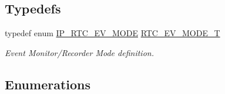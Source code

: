 \subsection*{Typedefs}
\begin{DoxyCompactItemize}
\item 
typedef enum \hyperlink{group___r_t_c__18_x_x__43_x_x_gaefde431348a2ce3d7721a63780e9d9ba}{I\+P\+\_\+\+R\+T\+C\+\_\+\+E\+V\+\_\+\+M\+O\+DE} \hyperlink{group___r_t_c__18_x_x__43_x_x_gabcbfff4a7d52791dc0b1cdcb078a2a05}{R\+T\+C\+\_\+\+E\+V\+\_\+\+M\+O\+D\+E\+\_\+T}
\begin{DoxyCompactList}\small\item\em Event Monitor/\+Recorder Mode definition. \end{DoxyCompactList}\end{DoxyCompactItemize}
\subsection*{Enumerations}
